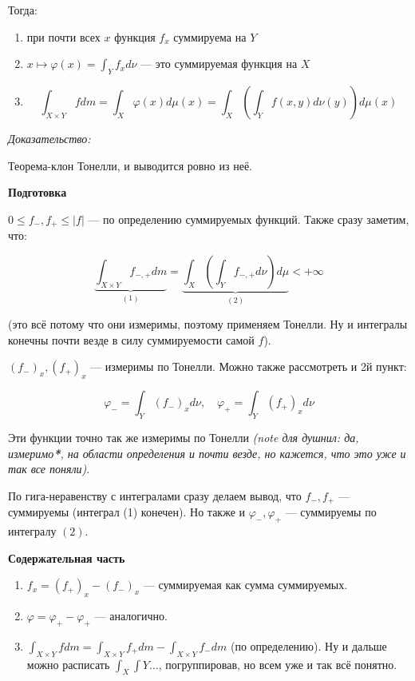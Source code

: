 \documentclass{article}
\begin{document}
Тогда:

\begin{enumerate}
    \item при почти всех $x$ функция $f_{x}$ суммируема на $Y$
    \item $x \mapsto \varphi(x) = \int_{Y} f_{x} d\nu$ --- это суммируемая функция на $X$
    \item \[\int_{X \times Y} f dm= \int_{X} \varphi(x) d \mu(x) = \int_{X} \left( \int_{Y} f(x, y) d  \nu (y)\right) d \mu(x)\]
\end{enumerate}

\textit{Доказательство:}

Теорема-клон Тонелли, и выводится ровно из неё.

\textbf{Подготовка}

$0 \le f_-, f_+ \le |f|$ --- по определению суммируемых функций. Также сразу заметим, что:

\[\underbrace{\int_{X \times Y} f_{-, +} dm}_{(1)} = \underbrace{\int_{X} \left( \int_{Y} f_{-, +} d\nu \right) d\mu}_{(2)} < +\infty \] 

(это всё потому что они измеримы, поэтому применяем Тонелли. Ну и интегралы конечны почти везде в силу суммируемости самой $f$).

$(f_-)_x, (f_+)_x$ --- измеримы по Тонелли. Можно также рассмотреть и 2й пункт:

\[\varphi_- = \int_{Y} (f_-)_x d\nu, \quad \varphi_+ = \int_{Y} (f_+)_x d\nu \]

Эти функции точно так же измеримы по Тонелли \textit{(note для душнил: да, измеримо\textbf{*}, на области определения и почти везде, но кажется, что это уже и так все поняли)}.

По гига-неравенству с интегралами сразу делаем вывод, что $f_-, f_+$ --- суммируемы (интеграл (1) конечен). Но также и $\varphi_-, \varphi_+$ --- суммируемы по интегралу $(2)$.

\textbf{Содержательная часть}

\begin{enumerate}
    \item $f_x = (f_+)_x - (f_-)_x$ --- суммируемая как сумма суммируемых.
    \item $\varphi = \varphi_+ - \varphi_+$ --- аналогично.
    \item $\int_{X \times Y} f dm =  \int_{X \times Y} f_+ dm - \int_{X \times Y} f_- dm$ (по определению). Ну и дальше можно расписать $\int_{X} \int{Y} \ldots$, погруппировав, но всем уже и так всё понятно.
\end{enumerate}
\end{document}
